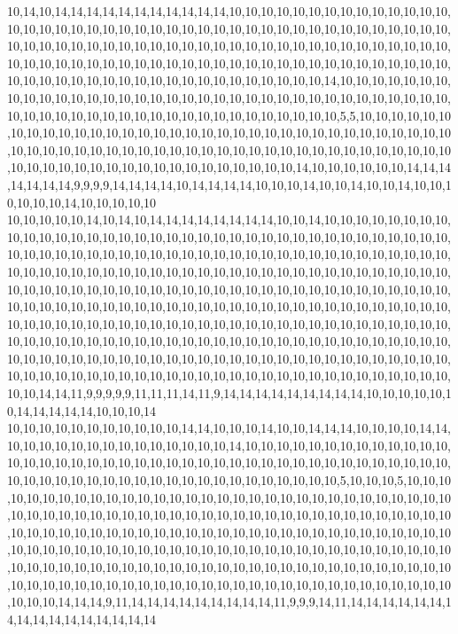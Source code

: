 10,14,10,14,14,14,14,14,14,14,14,14,14,14,10,10,10,10,10,10,10,10,10,10,10,10,10,10,10,10,10,10,10,10,10,10,10,10,10,10,10,10,10,10,10,10,10,10,10,10,10,10,10,10,10,10,10,10,10,10,10,10,10,10,10,10,10,10,10,10,10,10,10,10,10,10,10,10,10,10,10,10,10,10,10,10,10,10,10,10,10,10,10,10,10,10,10,10,10,10,10,10,10,10,10,10,10,10,10,10,10,10,10,10,10,10,10,10,10,10,10,10,10,10,10,10,10,10,10,10,10,10,14,10,10,10,10,10,10,10,10,10,10,10,10,10,10,10,10,10,10,10,10,10,10,10,10,10,10,10,10,10,10,10,10,10,10,10,10,10,10,10,10,10,10,10,10,10,10,10,10,10,10,10,10,10,10,10,10,5,5,10,10,10,10,10,10,10,10,10,10,10,10,10,10,10,10,10,10,10,10,10,10,10,10,10,10,10,10,10,10,10,10,10,10,10,10,10,10,10,10,10,10,10,10,10,10,10,10,10,10,10,10,10,10,10,10,10,10,10,10,10,10,10,10,10,10,10,10,10,10,10,10,10,10,10,10,10,10,10,10,14,10,10,10,10,10,10,14,14,14,14,14,14,14,9,9,9,9,14,14,14,14,10,14,14,14,14,10,10,10,14,10,10,14,10,10,14,10,10,10,10,10,10,14,10,10,10,10,10
10,10,10,10,10,14,10,14,10,14,14,14,14,14,14,14,14,10,10,14,10,10,10,10,10,10,10,10,10,10,10,10,10,10,10,10,10,10,10,10,10,10,10,10,10,10,10,10,10,10,10,10,10,10,10,10,10,10,10,10,10,10,10,10,10,10,10,10,10,10,10,10,10,10,10,10,10,10,10,10,10,10,10,10,10,10,10,10,10,10,10,10,10,10,10,10,10,10,10,10,10,10,10,10,10,10,10,10,10,10,10,10,10,10,10,10,10,10,10,10,10,10,10,10,10,10,10,10,10,10,10,10,10,10,10,10,10,10,10,10,10,10,10,10,10,10,10,10,10,10,10,10,10,10,10,10,10,10,10,10,10,10,10,10,10,10,10,10,10,10,10,10,10,10,10,10,10,10,10,10,10,10,10,10,10,10,10,10,10,10,10,10,10,10,10,10,10,10,10,10,10,10,10,10,10,10,10,10,10,10,10,10,10,10,10,10,10,10,10,10,10,10,10,10,10,10,10,10,10,10,10,10,10,10,10,10,10,10,10,10,10,10,10,10,10,10,10,10,10,10,10,10,10,10,10,10,10,10,10,10,10,10,10,10,10,10,10,10,10,10,10,10,10,10,10,10,10,10,10,10,10,10,14,14,11,9,9,9,9,9,11,11,11,14,11,9,14,14,14,14,14,14,14,14,14,10,10,10,10,10,10,14,14,14,14,14,10,10,10,14
10,10,10,10,10,10,10,10,10,10,10,14,14,10,10,10,14,10,10,14,14,14,10,10,10,10,14,14,10,10,10,10,10,10,10,10,10,10,10,10,10,10,14,10,10,10,10,10,10,10,10,10,10,10,10,10,10,10,10,10,10,10,10,10,10,10,10,10,10,10,10,10,10,10,10,10,10,10,10,10,10,10,10,10,10,10,10,10,10,10,10,10,10,10,10,10,10,10,10,10,10,10,10,10,10,5,10,10,10,5,10,10,10,10,10,10,10,10,10,10,10,10,10,10,10,10,10,10,10,10,10,10,10,10,10,10,10,10,10,10,10,10,10,10,10,10,10,10,10,10,10,10,10,10,10,10,10,10,10,10,10,10,10,10,10,10,10,10,10,10,10,10,10,10,10,10,10,10,10,10,10,10,10,10,10,10,10,10,10,10,10,10,10,10,10,10,10,10,10,10,10,10,10,10,10,10,10,10,10,10,10,10,10,10,10,10,10,10,10,10,10,10,10,10,10,10,10,10,10,10,10,10,10,10,10,10,10,10,10,10,10,10,10,10,10,10,10,10,10,10,10,10,10,10,10,10,10,10,10,10,10,10,10,10,10,10,10,10,10,10,10,10,10,10,10,10,10,10,10,10,10,10,10,10,14,14,14,9,11,14,14,14,14,14,14,14,14,14,11,9,9,9,14,11,14,14,14,14,14,14,14,14,14,14,14,14,14,14,14,14
